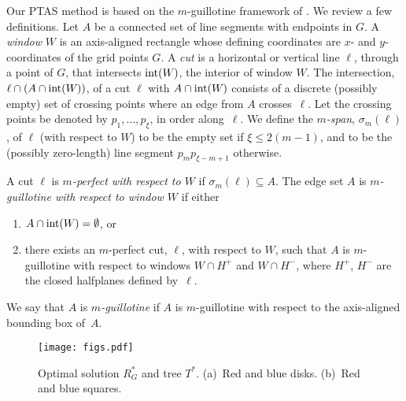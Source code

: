 \documentclass[11pt,a4paper]{article}
\DeclareMathOperator{\interior}{int}
\newcommand{\intW}{\interior(W\mspace{-1mu})}
\theoremstyle{definition}
\theoremstyle{remark}
\begin{document}
Our PTAS method is based on the $m$-guillotine framework of
\citet{mitchell99guillotine}.  We review a few definitions.  Let $A$ be
a connected set of line segments with endpoints in $G$. A {\em window}
$W$ is an axis-aligned rectangle whose defining coordinates are $x$- and
$y$-coordinates of the grid points $G$.  A {\em cut} is a horizontal
or vertical line $\ell$, through a point of $G$, that intersects
$\intW$, the interior of window $W$. The intersection, $\ell\cap
(A\cap \intW)$, of a cut $\ell$ with $A\cap \intW$ consists of a
discrete (possibly empty) set of crossing points where an edge from
$A$ crosses~$\ell$. Let the crossing points be denoted by
$p_1,\ldots,p_{\xi}$, in order along~$\ell$.  We define the {\em
  $m$-span}, $\sigma_m(\ell)$, of $\ell$ (with respect to $W$) to be
the empty set if $\xi\leq 2(m-1)$, and to be the (possibly
zero-length) line segment $p_{m}p_{\xi-m+1}$ otherwise.

A cut $\ell$ is {\em $m$-perfect with respect to $W$} if
$\sigma_m(\ell)\subseteq A$.  The edge set $A$ is {\em $m$-guillotine
  with respect to window $W$} if either
\begin{enumerate}
    \item $A\cap \intW=\emptyset$, or
    \item there exists an $m$-perfect cut, $\ell$, with respect to
      $W$, such that $A$ is $m$-guillotine with respect to windows
      $W\cap H^+$ and $W\cap H^-$, where $H^+$, $H^-$ are the closed
      halfplanes defined by~$\ell$.
\end{enumerate}
We say that $A$ is {\em $m$-guillotine} if $A$ is $m$-guillotine with
respect to the axis-aligned bounding box of~$A$.

\begin{figure}\centering
\texttt{[image: figs.pdf]}
\caption{Optimal solution $R_G^*$ and tree $T^*$. (a)~Red and blue disks. (b)~Red and blue squares.}\label{fig:redblue}
\end{figure}
\end{document}
